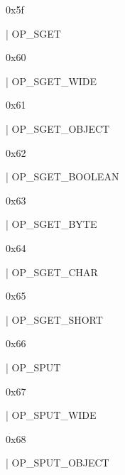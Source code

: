 \documentclass[11pt]{article}
\begin{document}
\begin{ocamldoccomment}
0x5f
\end{ocamldoccomment}
\begin{ocamldoccode}
  | OP_SGET
\end{ocamldoccode}
\begin{ocamldoccomment}
0x60
\end{ocamldoccomment}
\begin{ocamldoccode}
  | OP_SGET_WIDE
\end{ocamldoccode}
\begin{ocamldoccomment}
0x61
\end{ocamldoccomment}
\begin{ocamldoccode}
  | OP_SGET_OBJECT
\end{ocamldoccode}
\begin{ocamldoccomment}
0x62
\end{ocamldoccomment}
\begin{ocamldoccode}
  | OP_SGET_BOOLEAN
\end{ocamldoccode}
\begin{ocamldoccomment}
0x63
\end{ocamldoccomment}
\begin{ocamldoccode}
  | OP_SGET_BYTE
\end{ocamldoccode}
\begin{ocamldoccomment}
0x64
\end{ocamldoccomment}
\begin{ocamldoccode}
  | OP_SGET_CHAR
\end{ocamldoccode}
\begin{ocamldoccomment}
0x65
\end{ocamldoccomment}
\begin{ocamldoccode}
  | OP_SGET_SHORT
\end{ocamldoccode}
\begin{ocamldoccomment}
0x66
\end{ocamldoccomment}
\begin{ocamldoccode}
  | OP_SPUT
\end{ocamldoccode}
\begin{ocamldoccomment}
0x67
\end{ocamldoccomment}
\begin{ocamldoccode}
  | OP_SPUT_WIDE
\end{ocamldoccode}
\begin{ocamldoccomment}
0x68
\end{ocamldoccomment}
\begin{ocamldoccode}
  | OP_SPUT_OBJECT
\end{ocamldoccode}
\end{document}

